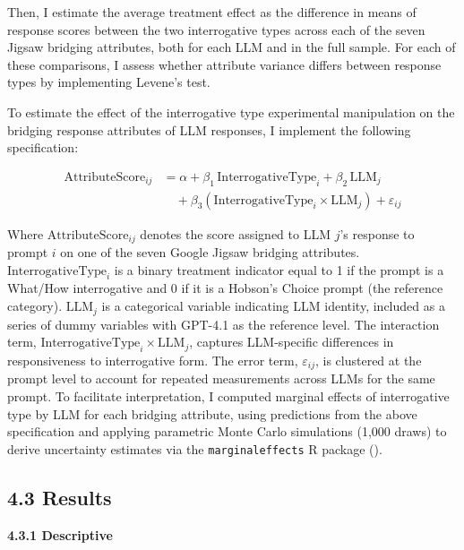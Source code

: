 \documentclass[
  12pt,
]{article}
\begin{document}
Then, I estimate the average treatment effect as the difference in means of response scores between the two interrogative types across each of the seven Jigsaw bridging attributes, both for each LLM and in the full sample. For each of these comparisons, I assess whether attribute variance differs between response types by implementing Levene's test.

To estimate the effect of the interrogative type experimental manipulation on the bridging response attributes of LLM responses, I implement the following specification:

\[
\begin{aligned}
\text{AttributeScore}_{ij} &= \alpha
+ \beta_{1} \, \text{InterrogativeType}_{i}
+ \beta_{2} \, \text{LLM}_{j} \\
&\quad + \beta_{3} \left( \text{InterrogativeType}_{i} \times \text{LLM}_{j} \right)
+ \varepsilon_{ij}
\end{aligned}
\]

Where \(\text{AttributeScore}_{ij}\) denotes the score assigned to LLM \(j\)'s response to prompt \(i\) on one of the seven Google Jigsaw bridging attributes. \(\text{InterrogativeType}_{i}\) is a binary treatment indicator equal to 1 if the prompt is a What/How interrogative and 0 if it is a Hobson's Choice prompt (the reference category). \(\text{LLM}_{j}\) is a categorical variable indicating LLM identity, included as a series of dummy variables with GPT-4.1 as the reference level. The interaction term, \(\text{InterrogativeType}_{i}\times\text{LLM}_{j}\), captures LLM-specific differences in responsiveness to interrogative form. The error term, \(\varepsilon_{ij}\), is clustered at the prompt level to account for repeated measurements across LLMs for the same prompt. To facilitate interpretation, I computed marginal effects of interrogative type by LLM for each bridging attribute, using predictions from the above specification and applying parametric Monte Carlo simulations (1,000 draws) to derive uncertainty estimates via the \texttt{marginaleffects} R package ().

\clearpage

\subsection{4.3 Results}\label{results-2}

\textbf{4.3.1 Descriptive}
\end{document}
